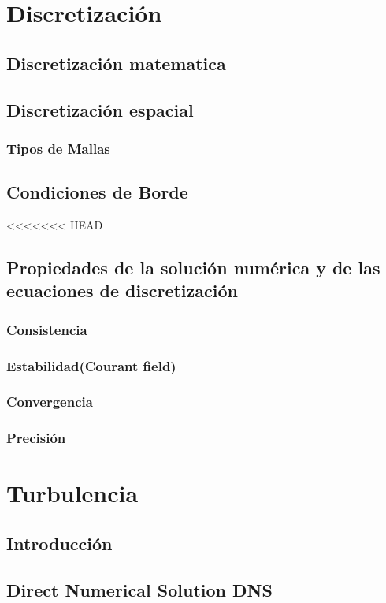 \section{Discretización}
	\subsection{Discretización matematica}
	\subsection{Discretización espacial}
		\subsubsection{Tipos de Mallas}
	\subsection{Condiciones de Borde}
<<<<<<< HEAD
	\subsection{Propiedades de la solución numérica y de las ecuaciones de discretización}
		\subsubsection{Consistencia}
		\subsubsection{Estabilidad(Courant field)}
		\subsubsection{Convergencia}
		\subsubsection{Precisión}
		
\section{Turbulencia}
	\subsection{Introducción}%
	\subsection{Direct Numerical  Solution DNS}
